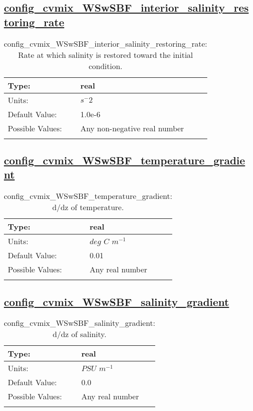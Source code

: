 \subsection[config\_cvmix\_WSwSBF\_interior\_salinity\_restoring\_rate]{\hyperref[sec:nm_tab_cvmix_WSwSBF]{config\_cvmix\_WSwSBF\_interior\_salinity\_restoring\_rate}}
\label{subsec:nm_sec_config_cvmix_WSwSBF_interior_salinity_restoring_rate}
\begin{center}
\begin{longtable}{| p{2.0in} || p{4.0in} |}
    \hline
    Type: & real \\
    \hline
    Units: & ${s}^-2$ \\
    \hline
    Default Value: & 1.0e-6 \\
    \hline
    Possible Values: & Any non-negative real number \\
    \hline
    \caption{config\_cvmix\_WSwSBF\_interior\_salinity\_restoring\_rate: Rate at which salinity is restored toward the initial condition.}
\end{longtable}
\end{center}
\subsection[config\_cvmix\_WSwSBF\_temperature\_gradient]{\hyperref[sec:nm_tab_cvmix_WSwSBF]{config\_cvmix\_WSwSBF\_temperature\_gradient}}
\label{subsec:nm_sec_config_cvmix_WSwSBF_temperature_gradient}
\begin{center}
\begin{longtable}{| p{2.0in} || p{4.0in} |}
    \hline
    Type: & real \\
    \hline
    Units: & $deg$ $C$ $m^{-1}$ \\
    \hline
    Default Value: & 0.01 \\
    \hline
    Possible Values: & Any real number \\
    \hline
    \caption{config\_cvmix\_WSwSBF\_temperature\_gradient: d/dz of temperature.}
\end{longtable}
\end{center}
\subsection[config\_cvmix\_WSwSBF\_salinity\_gradient]{\hyperref[sec:nm_tab_cvmix_WSwSBF]{config\_cvmix\_WSwSBF\_salinity\_gradient}}
\label{subsec:nm_sec_config_cvmix_WSwSBF_salinity_gradient}
\begin{center}
\begin{longtable}{| p{2.0in} || p{4.0in} |}
    \hline
    Type: & real \\
    \hline
    Units: & $PSU$ $m^{-1}$ \\
    \hline
    Default Value: & 0.0 \\
    \hline
    Possible Values: & Any real number \\
    \hline
    \caption{config\_cvmix\_WSwSBF\_salinity\_gradient: d/dz of salinity.}
\end{longtable}
\end{center}

